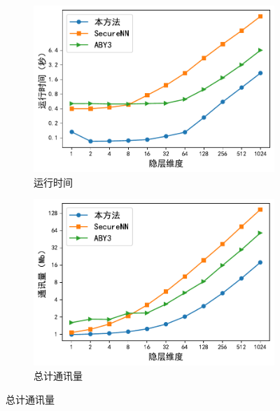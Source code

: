 %
\begin{figure}[h!]
    \centering
    \begin{subfigure}[b]{0.48\linewidth}
    \centering
    \includegraphics[width=\linewidth]{Z_Resources/ss-perm_one-layer-time.pdf}
    \caption{运行时间}
    \end{subfigure}
    \begin{subfigure}[b]{0.48\linewidth}
    \centering
    \includegraphics[width=\linewidth]{Z_Resources/ss-perm_one-layer-comm.pdf}
    \caption{总计通讯量}
    \end{subfigure}
    

\end{figure}
